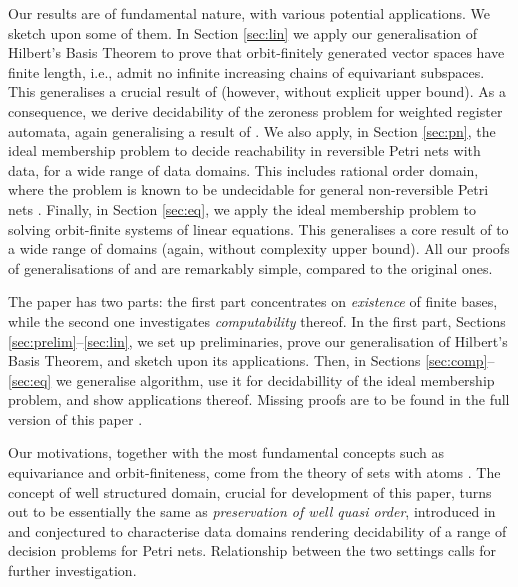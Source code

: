 Our results are of fundamental nature, with various potential applications.
We sketch upon some of them.
In Section \ref{sec:lin} we apply our generalisation of Hilbert's Basis Theorem to prove
that orbit-finitely generated vector spaces have finite length, i.e., admit no infinite increasing chains
of equivariant subspaces.
This generalises a crucial result of \cite{BKM21}
(however, without explicit upper bound).
As a consequence, we derive decidability of
the zeroness problem for weighted register automata, again 
generalising a result of \cite{BKM21}.
%
We also apply, in Section \ref{sec:pn}, the ideal membership problem 
to decide reachability in reversible Petri nets with data, for a wide range of data domains.
This includes rational order domain, where the problem is known to be undecidable 
for general non-reversible Petri nets \cite{LNORW07}.
Finally, 
in Section \ref{sec:eq}, we apply the ideal membership problem 
to solving orbit-finite systems of linear equations.
This generalises a core result of \cite{GHL22} to a wide range of domains
(again, without complexity upper bound).
All our proofs of generalisations of \cite{BKM21} and \cite{GHL22}
are remarkably simple, compared to the original ones.

The paper has two parts: the first part concentrates on \emph{existence} of finite bases,
while the second one investigates \emph{computability} thereof.
In the first part, Sections \ref{sec:prelim}--\ref{sec:lin},
we set up preliminaries, prove our generalisation of Hilbert's Basis Theorem,
and sketch upon its applications.
Then, in Sections \ref{sec:comp}--\ref{sec:eq}
we generalise \Bu algorithm, use it for decidabillity of the ideal membership problem, 
and show applications thereof.
%
Missing proofs are to be found in the full version of this paper \cite{GL24-arxiv}.

Our motivations, together with the most fundamental concepts such as equivariance and orbit-finiteness, 
come from the theory of sets with atoms \cite{BKL14,atombook}.
%
The concept of well structured domain, crucial for development of this paper,
turns out to be essentially the same as \emph{preservation of well quasi order}, 
introduced in \cite{Lasota16} and conjectured to characterise data domains
rendering decidability of a range of decision problems for Petri nets.
Relationship between the two settings calls for further investigation.

